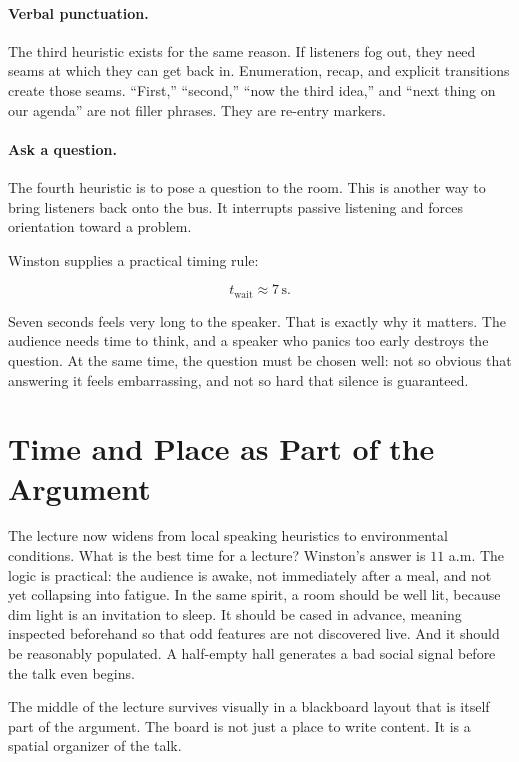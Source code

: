 \paragraph{Verbal punctuation.} The third heuristic exists for the same reason. If listeners fog out, they need seams at which they can get back in. Enumeration, recap, and explicit transitions create those seams. ``First,'' ``second,'' ``now the third idea,'' and ``next thing on our agenda'' are not filler phrases. They are re-entry markers.

\paragraph{Ask a question.} The fourth heuristic is to pose a question to the room. This is another way to bring listeners back onto the bus. It interrupts passive listening and forces orientation toward a problem.

Winston supplies a practical timing rule:

\begin{equation}
t_{\mathrm{wait}} \approx 7\,\mathrm{s}.
\end{equation}

Seven seconds feels very long to the speaker. That is exactly why it matters. The audience needs time to think, and a speaker who panics too early destroys the question. At the same time, the question must be chosen well: not so obvious that answering it feels embarrassing, and not so hard that silence is guaranteed.

\section{Time and Place as Part of the Argument}

The lecture now widens from local speaking heuristics to environmental conditions. What is the best time for a lecture? Winston's answer is \(11\) a.m. The logic is practical: the audience is awake, not immediately after a meal, and not yet collapsing into fatigue. In the same spirit, a room should be well lit, because dim light is an invitation to sleep. It should be cased in advance, meaning inspected beforehand so that odd features are not discovered live. And it should be reasonably populated. A half-empty hall generates a bad social signal before the talk even begins.

The middle of the lecture survives visually in a blackboard layout that is itself part of the argument. The board is not just a place to write content. It is a spatial organizer of the talk.

